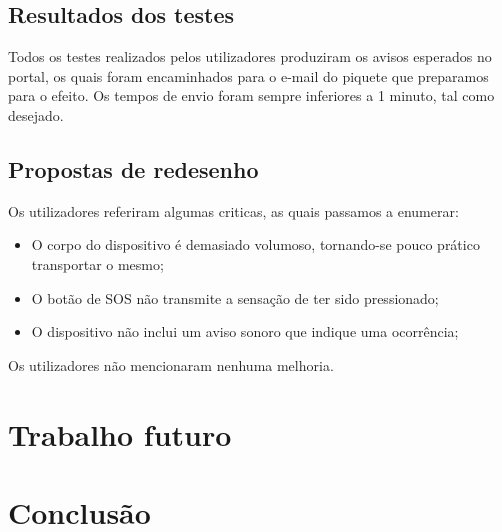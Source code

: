 \FloatBarrier\subsection{Resultados dos testes}

Todos os testes realizados pelos utilizadores produziram os avisos esperados no portal, os quais foram encaminhados para o e-mail do piquete que preparamos para o efeito. Os tempos de envio foram sempre inferiores a 1 minuto, tal como desejado.

\subsection{Propostas de redesenho}

Os utilizadores referiram algumas criticas, as quais passamos a enumerar:
\begin{itemize}
	\item O corpo do dispositivo é demasiado volumoso, tornando-se pouco prático transportar o mesmo;
	\item O botão de SOS não transmite a sensação de ter sido pressionado;
	\item O dispositivo não inclui um aviso sonoro que indique uma ocorrência;
\end{itemize}

Os utilizadores não mencionaram nenhuma melhoria.

\section{Trabalho futuro}



\section{Conclusão}

 